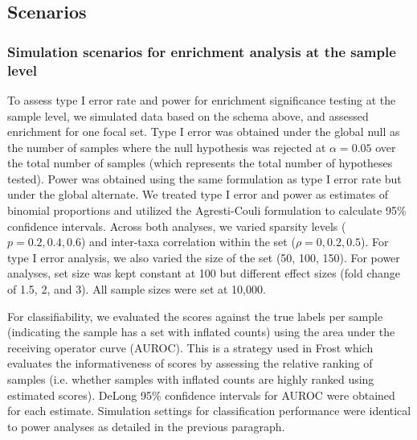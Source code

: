 \subsection{Scenarios}
\subsubsection{Simulation scenarios for enrichment analysis at the sample level}
To assess type I error rate and power for enrichment significance testing at the sample level, we simulated data based on the schema above, and assessed enrichment for one focal set. Type I error was obtained under the global null as the number of samples where the null hypothesis was rejected at $\alpha = 0.05$ over the total number of samples (which represents the total number of hypotheses tested). Power was obtained using the same formulation as type I error rate but under the global alternate. We treated type I error and power as estimates of binomial proportions and utilized the Agresti-Couli \cite{agresti1998approximate} formulation to calculate 95\% confidence intervals. Across both analyses, we varied sparsity levels ($p = 0.2, 0.4, 0.6$) and inter-taxa correlation within the set ($\rho = 0, 0.2, 0.5$). For type I error analysis, we also varied the size of the set (50, 100, 150). For power analyses, set size was kept constant at 100 but different effect sizes (fold change of 1.5, 2, and 3). All sample sizes were set at 10,000. 

For classifiability, we evaluated the scores against the true labels per sample (indicating the sample has a set with inflated counts) using the area under the receiving operator curve (AUROC). This is a strategy used in Frost \cite{frost2020varianceadjusted} which evaluates the informativeness of scores by assessing the relative ranking of samples (i.e. whether samples with inflated counts are highly ranked using estimated scores).  DeLong 95\% confidence intervals for AUROC \cite{delong1988comparing} were obtained for each estimate. Simulation settings for classification performance were identical to power analyses as detailed in the previous paragraph. 

